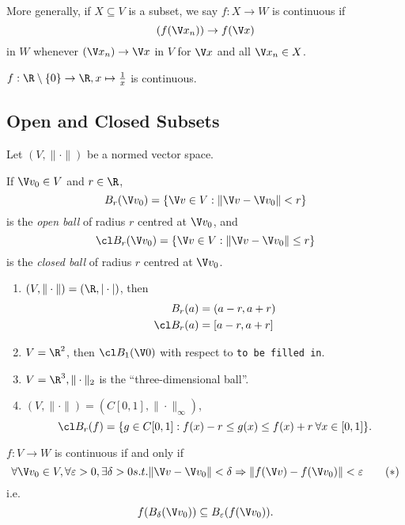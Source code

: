 \documentclass[a4paper]{article}
\theoremstyle{definition}
\begin{document}
More generally, if $X\subseteq V$ is a subset, we say $f:X\to W$ is continuous if
\[
  (f(\V x_n)) \to f(\V x)
\]
in $W$ whenever $(\V x_n) \to \V x$ in $V$ for $\V x$ and all $\V x_n \in X$.

\begin{eg}
  $f:\R \setminus \{0\} \to \R, x \mapsto \frac{1}{x}$ is continuous.
\end{eg}

\subsection{Open and Closed Subsets}

Let $(V, \|\cdot\|)$ be a normed vector space.

\begin{definition}
  If $\V v_0 \in V$ and $r \in \R$,
  \[
    B_r(\V v_0) = \{\V v\in V: \|\V v - \V v_0\| < r \}
  \]
  is the \emph{open ball} of radius $r$ centred at $\V v_0$, and
  \[
    \cl B_r(\V v_0) = \{\V v\in V: \|\V v - \V v_0\| \leq r \}
  \]
  is the \emph{closed ball} of radius $r$ centred at $\V v_0$.
\end{definition}

\begin{eg}\leavevmode
  \begin{enumerate}
  \item $(V, \|\cdot\|) = (\R, |\cdot|)$, then
    \begin{align*}
      B_r(a) &= (a-r, a+r) \\
      \cl B_r(a) &= [a-r, a+r] 
    \end{align*}
  \item $V=\R^2$, then $\cl B_1(\V 0)$ with respect to \texttt{to be filled in}.
\item $V = \R^3, \|\cdot\|_2$ is the ``three-dimensional ball''.
\item $(V, \|\cdot\|) = (C[0,1], \|\cdot\|_\infty)$,
  \[
    \cl B_r(f) = \{g\in C[0,1]: f(x)-r \leq g(x) \leq f(x) + r \: \forall x \in [0,1]\}.
  \]
  \end{enumerate}
\end{eg}

\begin{proposition}
  $f:V\to W$ is continuous if and only if
  \begin{equation*}
    \label{eqn:alternate continuity}
    \forall \V v_0 \in V, \forall \varepsilon>0, \exists \delta>0 s.t. \|\V v- \V v_0\| < \delta \Rightarrow \|f(\V v) - f(\V v_0)\| < \varepsilon
    \tag{$\ast$}
    \end{equation*}
  i.e.\ 
  \[
    f(B_\delta(\V v_0)) \subseteq B_\varepsilon(f(\V v_0)).
    \]
\end{proposition}
\end{document}

